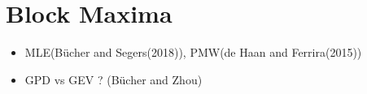 \documentclass{beamer}
\begin{document}
\section{Block Maxima}
\begin{frame}
    \begin{itemize}
        \item  MLE(B\"ucher and Segers(2018)), PMW(de Haan and Ferrira(2015))
        \item GPD vs GEV ? (B\"ucher and Zhou)
    \end{itemize}
\end{frame}
\end{document}
